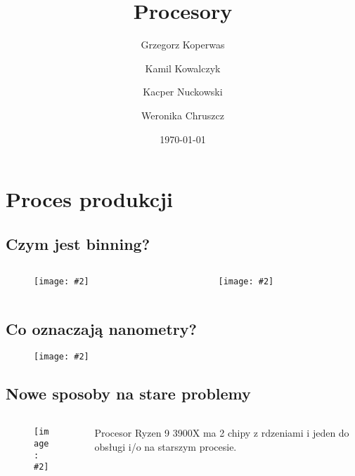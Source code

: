 \documentclass[aspectratio=169]{beamer}
\title{Procesory}
\author{Grzegorz Koperwas \and Kamil Kowalczyk \and Kacper Nuckowski \and Weronika Chruszcz}
\date{\today}
\newcommand{\obrazek}[2]{
\begin{figure}[h]
    \centering
    \texttt{[image: \#2]}
\end{figure}
}
\begin{document}
\begin{frame}
    \titlepage
\end{frame}

\section{Proces produkcji}
\subsection{Czym jest binning?}
\begin{frame}
    \begin{columns}
        \begin{column}{.5\textwidth}
            \obrazek{.1}{/home/hakiergrzonzo/Desktop/polibuda/notatki II/LTK/procesor/tsmc.jpg}
        \end{column}
        \begin{column}{.5\textwidth}
            \obrazek{.1}{/home/hakiergrzonzo/Desktop/polibuda/notatki II/LTK/procesor/binning.png}
        \end{column}
    \end{columns}
\end{frame}

\subsection{Co oznaczają nanometry?}
\begin{frame}
    \obrazek{.5}{/home/hakiergrzonzo/Desktop/polibuda/notatki II/LTK/procesor/process.png}
\end{frame}

\subsection{Nowe sposoby na stare problemy}
\begin{frame}
    \begin{columns}
        \begin{column}{.6\textwidth}
            \obrazek{.25}{/home/hakiergrzonzo/Desktop/polibuda/notatki II/LTK/procesor/ryzen.jpg}
        \end{column}
        \begin{column}{.4\textwidth}
            Procesor Ryzen 9 3900X ma 2 chipy z rdzeniami i jeden do obsługi i/o na starszym procesie.
        \end{column}
    \end{columns}
\end{frame}
\end{document}
